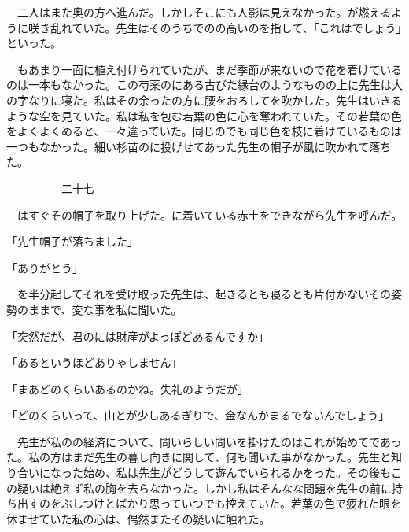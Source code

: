 \documentclass[a4j,onecolumn]{tarticle}
\begin{document}
　二人はまた奥の方へ進んだ。\hbox{}しかしそこにも人影は見えなかった。\hbox{}が燃えるように咲き乱れていた。\hbox{}先生はそのうちでのの高いのを指して、\hbox{}「これはでしょう」といった。\hbox{}\par{}
　もあまり一面に植え付けられていたが、\hbox{}まだ季節が来ないので花を着けているのは一本もなかった。\hbox{}この芍薬のにある古びた縁台のようなものの上に先生は大の字なりに寝た。\hbox{}私はその余ったの方に腰をおろしてを吹かした。\hbox{}先生はいきるような空を見ていた。\hbox{}私は私を包む若葉の色に心を奪われていた。\hbox{}その若葉の色をよくよくめると、\hbox{}一々違っていた。\hbox{}同じのでも同じ色を枝に着けているものは一つもなかった。\hbox{}細い杉苗のに投げせてあった先生の帽子が風に吹かれて落ちた。\hbox{}\par{}\par{}　　　　　二十七
\par{}
　はすぐその帽子を取り上げた。\hbox{}に着いている赤土をできながら先生を呼んだ。\hbox{}\par{}
「先生帽子が落ちました」\par{}
「ありがとう」\par{}
　を半分起してそれを受け取った先生は、\hbox{}起きるとも寝るとも片付かないその姿勢のままで、\hbox{}変な事を私に聞いた。\hbox{}\par{}
「突然だが、\hbox{}君のには財産がよっぽどあるんですか」\par{}
「あるというほどありゃしません」\par{}
「まあどのくらいあるのかね。\hbox{}失礼のようだが」\par{}
「どのくらいって、\hbox{}山とが少しあるぎりで、\hbox{}金なんかまるでないんでしょう」\par{}
　先生が私のの経済について、\hbox{}問いらしい問いを掛けたのはこれが始めてであった。\hbox{}私の方はまだ先生の暮し向きに関して、\hbox{}何も聞いた事がなかった。\hbox{}先生と知り合いになった始め、\hbox{}私は先生がどうして遊んでいられるかをった。\hbox{}その後もこの疑いは絶えず私の胸を去らなかった。\hbox{}しかし私はそんなな問題を先生の前に持ち出すのをぶしつけとばかり思っていつでも控えていた。\hbox{}若葉の色で疲れた眼を休ませていた私の心は、\hbox{}偶然またその疑いに触れた。\hbox{}\par{}
\end{document}
